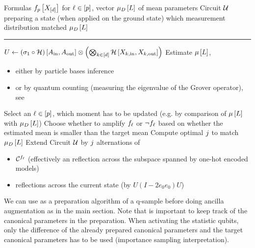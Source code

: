 \begin{algorithm}
    \caption{Quantum Circuit Moment Matcher}\label{alg:QCMM}
    \begin{algorithmic}
        \Require Formulas $f_{p}\left[X_{[d]}\right]$ for $\ell\in[p]$, vector $\mu_{D}\left[L\right]$ of mean parameters
        \Ensure Circuit $\mathcal{U}$ preparing a state (when applied on the ground state) which measurement distribution matched $\mu_{D}\left[L\right]$\\
        \hrule
        \State $U\leftarrow (\sigma_1\circ\mathcal{H})\left[A_{\mathrm{in}},A_{\mathrm{out}}\right] \otimes
        \left(\bigotimes_{k\in[d]}\mathcal{H}\left[X_{k,\mathrm{in}},X_{k,\mathrm{out}}\right]\right)
        $
            \State Estimate $\mu\left[L\right]$,
            \begin{itemize}
                \item either by particle bases inference
                \item or by quantum counting (measuring the eigenvalue of the Grover operator), see 
            \end{itemize}
            \State Select an $\ell\in[p]$, which moment has to be updated (e.g. by comparison of $\mu\left[L\right]$ with $\mu_{D}\left[L\right]$)
            \State Choose whether to amplify $f_{\ell}$ or $\lnot f_{\ell}$ based on whether the estimated mean is smaller than the target mean
            \State Compute optimal $j$ to match $\mu_{D}\left[L\right]$
            \State Extend Circuit $\mathcal{U}$ by $j$ alternations of
            \begin{itemize}
                \item $\mathcal{C}^{f_{\ell}}$ (effectively an reflection across the subspace spanned by one-hot encoded models)
                \item reflections across the current state (by $U(I-2e_0e_0)U$)
            \end{itemize}
        \EndWhile
    \end{algorithmic}
\end{algorithm}


We can use  as a preparation algorithm of a q-sample before doing ancilla augmentation as in the main section.
Note that is important to keep track of the canonical parameters in the preparation.
When activating the statistic qubits, only the difference of the already prepared canonical parameters and the target canonical parameters has to be used (importance sampling interpretation).

